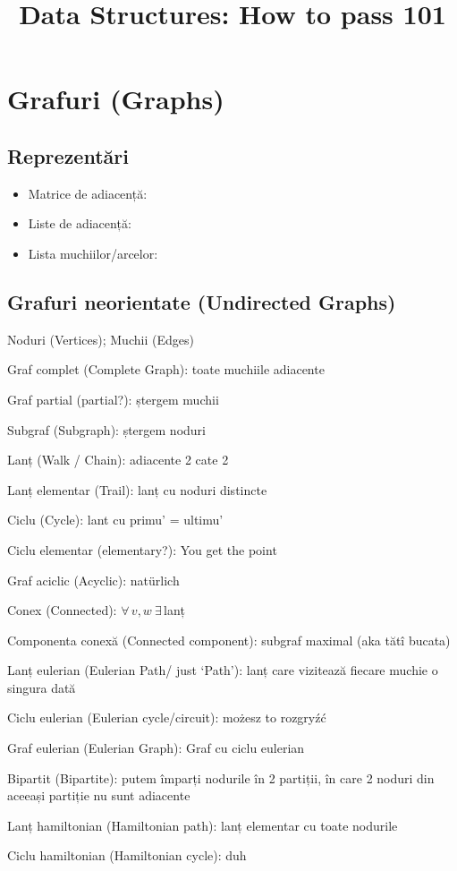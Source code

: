 \documentclass[11pt,a4paper]{report}
\title{Data Structures: How to pass 101}
\begin{document}
\section*{Grafuri (Graphs)}
\subsection*{Reprezentări}
\begin{itemize} \setlength{\itemsep}{-2pt}
  \item Matrice de adiacență:  %
  \item Liste de adiacență: 
  \item Lista muchiilor/arcelor: 
\end{itemize}

\subsection*{Grafuri neorientate (Undirected Graphs)}
\begin{description}\setlength{\itemsep}{-2pt}
  \item Noduri (Vertices); Muchii (Edges)
  \item Graf complet (Complete Graph): toate muchiile adiacente
  \item Graf partial (partial?): ștergem muchii
  \item Subgraf (Subgraph): ștergem noduri
  \item Lanț (Walk / Chain): adiacente 2 cate 2
  \item Lanț elementar (Trail): lanț cu noduri distincte
  \item Ciclu (Cycle): lant cu primu' = ultimu'
  \item Ciclu elementar (elementary?): You get the point
  \item Graf aciclic (Acyclic): natürlich
  \item Conex (Connected): $\forall\,v, w\  \exists\,$lanț
  \item Componenta conexă (Connected component): subgraf maximal (aka tătî bucata)
  \item Lanț eulerian (Eulerian Path/ just `Path'): lanț care vizitează fiecare muchie o singura dată
  \item Ciclu eulerian (Eulerian cycle/circuit): możesz to rozgryźć
  \item Graf eulerian (Eulerian Graph): Graf cu ciclu eulerian
  \item Bipartit (Bipartite): putem împarți nodurile în 2 partiții, în care 2 noduri din aceeași partiție nu sunt adiacente
  \item Lanț hamiltonian (Hamiltonian path): lanț elementar cu toate nodurile
  \item Ciclu hamiltonian (Hamiltonian cycle): duh
\end{description}
\end{document}
